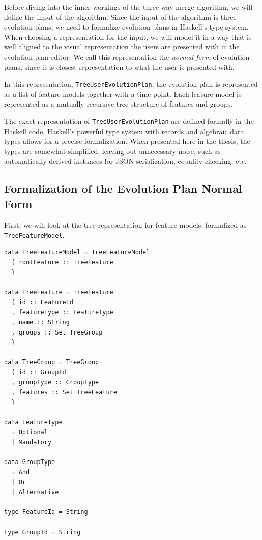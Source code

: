 \documentclass[a4paper,english]{ifimaster}
\begin{document}
Before diving into the inner workings of the three-way merge algorithm, we will define the input of the algorithm. Since the input of the algorithm is three evolution plans, we need to formalize evolution plans in Haskell's type system. When choosing a representation for the input, we will model it in a way that is well aligned to the visual representation the users are presented with in the evolution plan editor. We call this representation the \textit{normal form} of evolution plans, since it is closest representation to what the user is presented with.

In this representation, \texttt{Tree\-User\-Evolution\-Plan}, the evolution plan is represented as a list of feature models together with a time point. Each feature model is represented as a mutually recursive tree structure of features and groups. 

The exact representation of \texttt{Tree\-User\-Evolution\-Plan} are defined formally in the Haskell code. Haskell's powerful type system with records and algebraic data types allows for a precise formalization. When presented here in the thesis, the types are somewhat simplified, leaving out unnecessary noise, such as automatically derived instances for JSON serialization, equality checking, etc.

\subsection{Formalization of the Evolution Plan Normal Form}%
\label{sub:formalization_of_the_evolution_plan_normal_form}

First, we will look at the tree representation for feature models, formalized as \texttt{Tree\-Feature\-Model}.

\begin{verbatim}
data TreeFeatureModel = TreeFeatureModel
  { rootFeature :: TreeFeature
  }

data TreeFeature = TreeFeature
  { id :: FeatureId
  , featureType :: FeatureType
  , name :: String
  , groups :: Set TreeGroup
  }

data TreeGroup = TreeGroup
  { id :: GroupId
  , groupType :: GroupType
  , features :: Set TreeFeature
  }

data FeatureType
  = Optional
  | Mandatory

data GroupType
  = And
  | Or
  | Alternative

type FeatureId = String

type GroupId = String
\end{verbatim}
\end{document}
